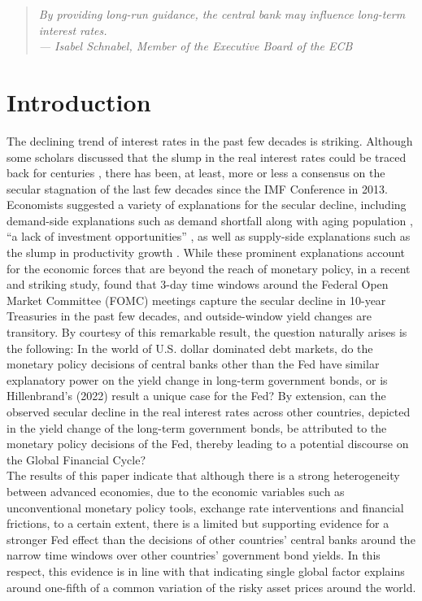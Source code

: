 \begin{quote}
    \itshape
    \setlength{\leftskip}{1cm}
    By providing long-run guidance, the central bank may influence long-term interest rates. \\
    \normalfont
    \hspace*{\fill}--- Isabel Schnabel, Member of the Executive Board of the ECB
\end{quote}

\section{Introduction}

The declining trend of interest rates in the past few decades is striking. Although some scholars discussed that the slump in the real interest rates could be traced back for centuries \citep{rogoff2022}, there has been, at least, more or less a consensus on the secular stagnation of the last few decades since the IMF Conference in 2013. Economists suggested a variety of explanations for the secular decline, including demand-side explanations such as demand shortfall along with aging population \citep{krugman2014four}, ``a lack of investment opportunities'' \citep{summers2014reflections}, as well as supply-side explanations such as the slump in productivity growth \citep{gordon2017rise}. While these prominent explanations account for the economic forces that are beyond the reach of monetary policy, in a recent and striking study, \citet{hillenbrand2022} found that 3-day time windows around the Federal Open Market Committee (FOMC) meetings capture the secular decline in 10-year Treasuries in the past few decades, and outside-window yield changes are transitory. By courtesy of this remarkable result, the question naturally arises is the following: In the world of U.S. dollar dominated debt markets, do the monetary policy decisions of central banks other than the Fed have similar explanatory power on the yield change in long-term government bonds, or is Hillenbrand's (2022) result a unique case for the Fed? By extension, can the observed secular decline in the real interest rates across other countries, depicted in the yield change of the long-term government bonds, be attributed to the monetary policy decisions of the Fed, thereby leading to a potential discourse on the Global Financial Cycle? \\

The results of this paper indicate that although there is a strong heterogeneity between advanced economies, due to the economic variables such as unconventional monetary policy tools, exchange rate interventions and financial frictions, to a certain extent, there is a limited but supporting evidence for a stronger Fed effect than the decisions of other countries' central banks around the narrow time windows over other countries' government bond yields. In this respect, this evidence is in line with \citet{miranda2020us} that indicating single global factor
explains around one-fifth of a common variation of the risky asset prices around the world. \\

